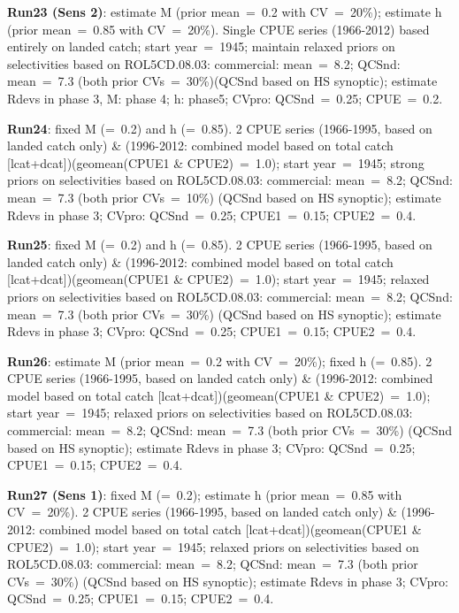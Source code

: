 {\bf Run23 (Sens 2)}: estimate M (prior mean~=~0.2 with CV~=~20\%); estimate h (prior mean~=~0.85 with CV~=~20\%).   Single CPUE series (1966-2012) based entirely on landed catch; start year~=~1945; maintain relaxed priors on selectivities based on ROL5CD.08.03: commercial: mean~=~8.2; QCSnd: mean~=~7.3 (both prior CVs~=~30\%)(QCSnd based on HS synoptic); estimate Rdevs in phase 3, M: phase 4; h: phase5; CVpro: QCSnd~=~0.25; CPUE~=~0.2. \newline

{\bf Run24}: fixed M (=~0.2) and h (=~0.85). 2 CPUE series (1966-1995, based on landed catch only) \& (1996-2012: combined model based on total catch [lcat+dcat])(geomean(CPUE1 \& CPUE2)~=~1.0); start year~=~1945; strong priors on selectivities based on ROL5CD.08.03: commercial: mean~=~8.2; QCSnd: mean~=~7.3 (both prior CVs~=~10\%) (QCSnd based on HS synoptic); estimate Rdevs in phase 3; CVpro: QCSnd~=~0.25; CPUE1~=~0.15; CPUE2~=~0.4. \newline

{\bf Run25}: fixed M (=~0.2) and h (=~0.85). 2 CPUE series (1966-1995, based on landed catch only) \& (1996-2012: combined model based on total catch [lcat+dcat])(geomean(CPUE1 \& CPUE2)~=~1.0); start year~=~1945; relaxed priors on selectivities based on ROL5CD.08.03: commercial: mean~=~8.2; QCSnd: mean~=~7.3 (both prior CVs~=~30\%) (QCSnd based on HS synoptic); estimate Rdevs in phase 3; CVpro: QCSnd~=~0.25; CPUE1~=~0.15; CPUE2~=~0.4. \newline

{\bf Run26}: estimate M (prior mean~=~0.2 with CV~=~20\%); fixed h (=~0.85). 2 CPUE series (1966-1995, based on landed catch only) \& (1996-2012: combined model based on total catch [lcat+dcat])(geomean(CPUE1 \& CPUE2)~=~1.0); start year~=~1945; relaxed priors on selectivities based on ROL5CD.08.03: commercial: mean~=~8.2; QCSnd: mean~=~7.3 (both prior CVs~=~30\%) (QCSnd based on HS synoptic); estimate Rdevs in phase 3; CVpro: QCSnd~=~0.25; CPUE1~=~0.15; CPUE2~=~0.4. \newline

{\bf Run27 (Sens 1)}: fixed M (=~0.2); estimate h (prior mean~=~0.85 with CV~=~20\%). 2 CPUE series (1966-1995, based on landed catch only) \& (1996-2012: combined model based on total catch [lcat+dcat])(geomean(CPUE1 \& CPUE2)~=~1.0); start year~=~1945; relaxed priors on selectivities based on ROL5CD.08.03: commercial: mean~=~8.2; QCSnd: mean~=~7.3 (both prior CVs~=~30\%) (QCSnd based on HS synoptic); estimate Rdevs in phase 3; CVpro: QCSnd~=~0.25; CPUE1~=~0.15; CPUE2~=~0.4. \newline

